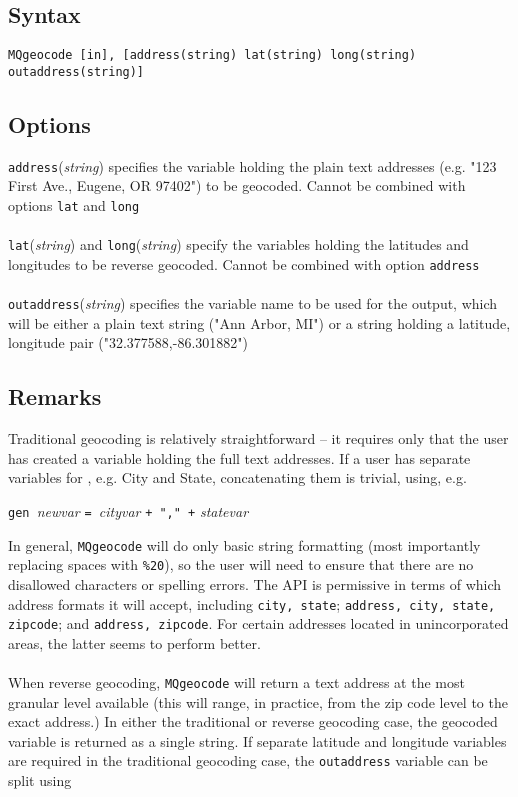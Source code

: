 \documentclass[12pt]{article}
\begin{document}
\subsection{Syntax}
\begin{verbatim}
MQgeocode [in], [address(string) lat(string) long(string) outaddress(string)]
\end{verbatim}

\subsection{Options}
\verb|address|(\textit{string}) specifies the variable holding the plain text addresses (e.g. "123 First Ave., Eugene, OR 97402") to be geocoded. Cannot be combined with options \verb|lat| and \verb|long|
\\ \\
\verb|lat|(\textit{string}) and \verb|long|(\textit{string}) specify the variables holding the latitudes and longitudes to be reverse geocoded. Cannot be combined with option \verb|address|
\\ \\
\verb|outaddress|(\textit{string}) specifies the variable name to be used for the output, which will be either a plain text string ("Ann Arbor, MI") or a string holding a latitude, longitude pair ("32.377588,-86.301882")

\subsection{Remarks}
Traditional geocoding is relatively straightforward -- it requires only that the user has created a variable holding the full text addresses. If a user has separate variables for , e.g. City and State, concatenating them is trivial, using, e.g.

 \begin{center}\verb|gen |\textit{newvar} \verb|= |\textit{cityvar} \verb|+ "," +| \textit{statevar} \end{center} 
In general, \verb|MQgeocode| will do only basic string formatting (most importantly replacing spaces with \verb|%20|), so the user will need to ensure that there are no disallowed characters or spelling errors. The API is permissive in terms of which address formats it will accept, including \verb|city, state|; \verb|address, city, state, zipcode|; and \verb|address, zipcode|. For certain addresses located in unincorporated areas, the latter seems to perform better. 
\\ \\
When reverse geocoding, \verb|MQgeocode| will return a text address at the most granular level available (this will range, in practice, from the zip code level to the exact address.) In either the traditional or reverse geocoding case, the geocoded variable is returned as a single string. If separate latitude and longitude variables are required in the traditional geocoding case, the \verb|outaddress| variable can be split using
\end{document}
